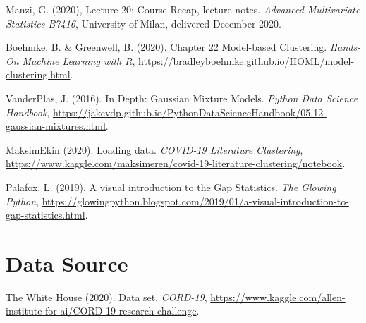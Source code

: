 \documentclass[12pt]{article}
\begin{document}
\begin{hangparas}{1em}{1}

Manzi, G. (2020), Lecture 20: Course Recap, lecture notes. \textit{Advanced Multivariate Statistics B7416}, University of Milan, delivered December 2020.

 Boehmke, B. \& Greenwell, B. (2020).  Chapter 22 Model-based Clustering. \textit{Hands-On Machine Learning with R}, \url{https://bradleyboehmke.github.io/HOML/model-clustering.html}.
 
 VanderPlas, J. (2016).  In Depth: Gaussian Mixture Models.  \textit{Python Data Science Handbook}, \url{https://jakevdp.github.io/PythonDataScienceHandbook/05.12-gaussian-mixtures.html}.

 MaksimEkin (2020).  Loading data. \textit{COVID-19 Literature Clustering}, \url{https://www.kaggle.com/maksimeren/covid-19-literature-clustering/notebook}.
 
 Palafox, L. (2019).  A visual introduction to the Gap Statistics. \textit{The Glowing Python}, \url{https://glowingpython.blogspot.com/2019/01/a-visual-introduction-to-gap-statistics.html}.
 
\section*{Data Source}

The White House (2020).  Data set. \textit {CORD-19}, \url{https://www.kaggle.com/allen-institute-for-ai/CORD-19-research-challenge}.
\end{hangparas}
\end{document}
